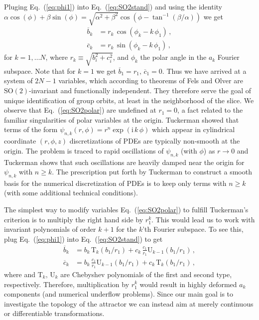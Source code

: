\documentclass[aip,cha,showpacs,reprint]{revtex4-1} %
\newcommand{\bseq}{\begin{subequations}}
\newcommand{\eseq}{\end{subequations}}
\newcommand{\rf}     [1] {\cite{#1}}
\newcommand{\refeq}  [1] {Eq.~(\ref{#1})}                   %
\newcommand{\SOn}[1]{\ensuremath{\textrm{SO}(#1)}}         %
\newcommand{\chebT}{\mathrm{T}}
\newcommand{\chebU}{\mathrm{U}}
\newcommand{\ii}{\ensuremath{\mathrm{i}}} %
\begin{document}
Pluging \refeq{eq:phi1} into \refeq{eq:SO2stand} and using
the identity
$\alpha\cos(\phi)+\beta\sin(\phi)=\sqrt{\alpha^2+\beta^2}\cos(\phi-\tan^{-1}(\beta/\alpha))$
we get
\bseq\label{eq:SO2polar}
  \begin{align}
    \overline{b}_k &=
		    r_k\, \cos(\phi_k-k\,\phi_1)\,, \label{eq:SO2polar1}\\
    \overline{c}_k &=
		    r_k\, \sin(\phi_k-k\,\phi_1)\,,\label{eq:SO2polar2}
  \end{align}
\eseq
for $k=1,\ldots N$, where $r_k\equiv\sqrt{b_i^2+c_i^2}$, and
$\phi_k$ the polar angle in the $a_k$ Fourier subspace.
Note that for $k=1$ we get $\overline{b}_1=r_1,\, \overline{c}_1=0$.
Thus we have arrived at a system of $2N-1$ variables, which according to
theorems of Fels and Olver\rf{FelsOlver98,FelsOlver99} are
$\SOn{2}$-invariant and functionally independent. They therefore serve the goal
of unique identification of group orbits, at least in the neighborhood of the
slice. We observe that \refeq{eq:SO2polar} are undefined at $r_1=0$,
a fact related to the familiar singularities of polar variables at the origin.
Tuckerman\rf{tuckerman89} showed that terms of the form $\psi_{n,k}(r,\phi)=r^n\exp(\ii\, k\,\phi)$
which appear in cylindrical coordinate $(r,\phi,z)$ discretizations of PDEs
are typically non-smooth at the origin. The problem is traced to rapid
oscillations of $\psi_{n,k}$ (with $\phi$) as $r\rightarrow0$ and Tuckerman\rf{tuckerman89} shows
that such oscillations are heavily damped near the origin for
$\psi_{n,k}$ with $n\geq k$. The prescription put forth by Tuckerman\rf{tuckerman89} to
construct a smooth basis for the numerical discretization of
PDEs is to keep only terms with $n\geq k$ (with some additional technical conditions).

The simplest way to modify variables \refeq{eq:SO2polar} to fulfill Tuckerman's
criterion is to multiply the right hand side by $r_1^k$. This would lead us to
work with invariant polynomials of order $k+1$ for the $k$'th Fourier subspace.
To see this, plug \refeq{eq:phi1} into \refeq{eq:SO2stand} to get
\bseq\label{eq:SO2cheb}
  \begin{align}
    \overline{b}_k &=
		    b_k\, \chebT_k\left(b_1/r_1\right)+
		    c_k\,\frac{c_1}{r_1} \chebU_{k-1}\left(b_1/r_1\right)\,, \label{eq:SO2cheb1}\\
    \overline{c}_k &=
		    b_k\, \frac{c_1}{r_1} \chebU_{k-1}\left(b_1/r_1\right)+
		    c_k\,\chebT_k\left(b_1/r_1\right)\,,  \label{eq:SO2cheb2}
  \end{align}
\eseq
where and $\chebT_k,\,\chebU_k$ are Chebyshev polynomials of the first and second type, respectively.
Therefore, multiplication by $r_1^k$ would result in highly deformed $a_k$ components
(and numerical underflow problems). Since our main goal is to investigate the
topology of the attractor we can instead aim at merely continuous or
differentiable transformations.
\end{document}
